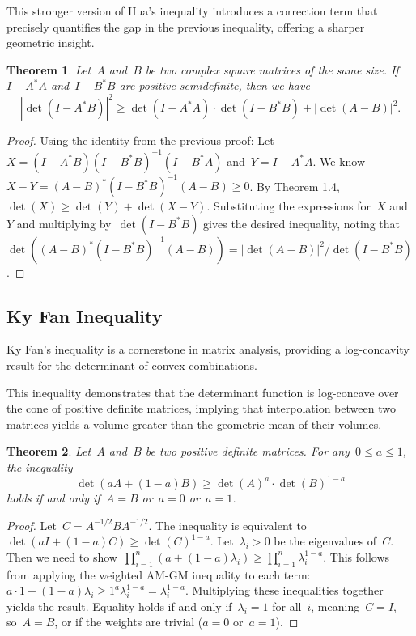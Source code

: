 \documentclass[12pt]{article}
\newtheorem{theorem}{Theorem}[section]
\begin{document}
\noindent This stronger version of Hua's inequality introduces a correction term that precisely quantifies the gap in the previous inequality, offering a sharper geometric insight.
\begin{theorem}
Let~$A$ and~$B$ be two complex square matrices of the same size. If~$I - A^*A$ and~$I - B^*B$ are positive semidefinite, then we have
\[ |\det(I - A^*B)|^2 \ge \det(I - A^*A) \cdot \det(I - B^*B) + |\det(A - B)|^2. \]
\end{theorem}
\begin{proof}
Using the identity from the previous proof: Let~$X = (I - A^*B)(I - B^*B)^{-1}(I - B^*A)$ and~$Y = I - A^*A$. We know~$X - Y = (A-B)^*(I - B^*B)^{-1}(A-B) \ge 0$. By Theorem 1.4,~$\det(X) \ge \det(Y) + \det(X-Y)$. Substituting the expressions for~$X$ and~$Y$ and multiplying by~$\det(I-B^*B)$ gives the desired inequality, noting that~$\det((A-B)^*(I - B^*B)^{-1}(A-B)) = |\det(A-B)|^2 / \det(I-B^*B)$.
\end{proof}

\subsection{Ky Fan Inequality}
Ky Fan's inequality is a cornerstone in matrix analysis, providing a log-concavity result for the determinant of convex combinations.

\noindent This inequality demonstrates that the determinant function is log-concave over the cone of positive definite matrices, implying that interpolation between two matrices yields a volume greater than the geometric mean of their volumes.
\begin{theorem}
Let~$A$ and~$B$ be two positive definite matrices. For any~$0 \le a \le 1$, the inequality
\[ \det(aA + (1 - a)B) \ge \det(A)^a \cdot \det(B)^{1-a} \]
holds if and only if~$A = B$ or~$a = 0$ or~$a = 1$.
\end{theorem}
\begin{proof}
Let~$C = A^{-1/2}BA^{-1/2}$. The inequality is equivalent to~$\det(aI + (1-a)C) \ge \det(C)^{1-a}$. Let~$\lambda_i > 0$ be the eigenvalues of~$C$. Then we need to show~$\prod_{i=1}^n (a + (1-a)\lambda_i) \ge \prod_{i=1}^n \lambda_i^{1-a}$. This follows from applying the weighted AM-GM inequality to each term:~$a \cdot 1 + (1-a)\lambda_i \ge 1^a \lambda_i^{1-a} = \lambda_i^{1-a}$. Multiplying these inequalities together yields the result. Equality holds if and only if~$\lambda_i = 1$ for all~$i$, meaning~$C=I$, so~$A=B$, or if the weights are trivial ($a=0$ or~$a=1$).
\end{proof}
\end{document}
